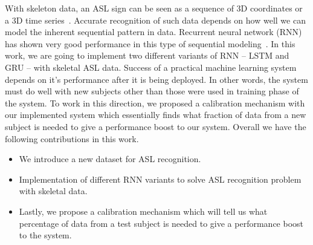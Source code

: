 \documentclass[10pt,twocolumn,letterpaper]{article}
\begin{document}
With skeleton data, an ASL sign can be seen as a sequence of 3D coordinates or a 3D time series~\cite{7298714}. Accurate recognition of such data depends on how well we can model the inherent sequential pattern in data. Recurrent neural network (RNN) has shown very good performance in this type of sequential modeling~\cite{DBLP:journals/corr/Lipton15}. In this work, we are going to implement two different variants of RNN -- LSTM and GRU -- with skeletal ASL data. Success of a practical machine learning system depends on it's performance after it is being deployed. In other words, the system must do well with new subjects other than those were used in training phase of the system. To work in this direction, we proposed a calibration mechanism with our implemented system which essentially finds what fraction of data from a new subject is needed to give a performance boost to our system. Overall we have the following contributions in this work.
\begin{itemize}  
	\item We introduce a new dataset for ASL recognition.
	\item Implementation of different RNN variants to solve ASL recognition problem with skeletal data.
	\item Lastly, we propose a calibration mechanism which will tell us what percentage of data from a test subject is needed to give a performance boost to the system.
\end{itemize}
\end{document}
